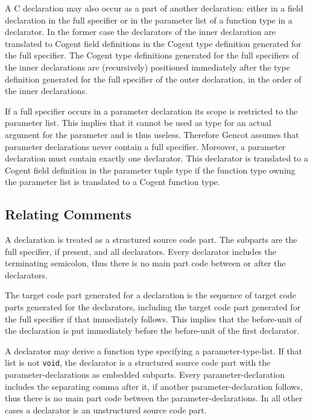 \documentclass[a4paper]{report}
\newcommand{\code}[1]{\textnormal{\texttt{#1}}}
\begin{document}
A C declaration may also occur as a part of another declaration: either in a field declaration in the full specifier 
or in the parameter list of a function type in a declarator. In the former case the declarators of the inner declaration
are translated to Cogent field definitions in the Cogent type definition generated for the full specifier. The Cogent
type definitions generated for the full specifiers of the inner declarations are (recursively) positioned immediately after the
type definition generated for the full specifier of the outer declaration, in the order of the inner declarations.

If a full specifier occurs in a parameter declaration its scope is restricted to the parameter list. This implies
that it cannot be used as type for an actual argument for the parameter and is thus useless. Therefore Gencot assumes
that parameter declarations never contain a full specifier. Moreover, a parameter declaration must contain exactly
one declarator. This declarator is translated to a Cogent field definition in the parameter tuple type if the
function type owning the parameter list is translated to a Cogent function type.

\subsection{Relating Comments}

A declaration is treated as a structured source code part. The subparts are the full specifier, if present, and all
declarators. Every declarator includes the terminating semicolon, thus there is no main part code between or after
the declarators.

The target code part generated for a declaration is the sequence of target code parts generated for the declarators,
including the target code part generated for the full specifier if that immediately follows. This implies that the
before-unit of the declaration is put immediately before the before-unit of the first declarator.

A declarator may derive a function type specifying a parameter-type-list. If that list is not \code{void}, the 
declarator is a structured source code part with the parameter-declarations as embedded subparts. Every
parameter-declaration includes the separating comma after it, if another parameter-declaration follows,
thus there is no main part code between the parameter-declarations. In all other cases a declarator is an unstructured
source code part.
\end{document}
